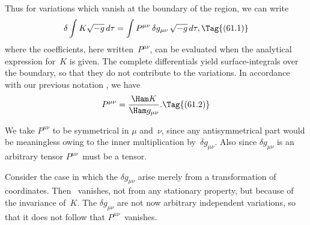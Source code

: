 \documentclass[12pt]{book}
\begin{document}
Thus for variations which vanish at the boundary of the region, we can
write
\[
\delta \int K \sqrt{-g}\, d\tau
= \int P^{\mu\nu}\, \delta g_{\mu\nu}\, \sqrt{-g}\, d\tau,
\Tag{(61.1)}
\]
where the coefficients, here written~$P^{\mu\nu}$, can be evaluated when the analytical
expression for~$K$ is given. The complete differentials yield surface-integrals
over the boundary, so that they do not contribute to the variations. In
accordance with our previous notation , we have
\[
P^{\mu\nu} = \frac{\Ham K}{\Ham g_{\mu\nu}}.
\Tag{(61.2)}
\]

We take $P^{\mu\nu}$ to be symmetrical in $\mu$ and~$\nu$, since any antisymmetrical part
would be meaningless owing to the inner multiplication by~$\delta g_{\mu\nu}$. Also since
$\delta g_{\mu\nu}$ is an arbitrary tensor $P^{\mu\nu}$~must be a tensor.

Consider the case in which the $\delta g_{\mu\nu}$ arise merely from a transformation of
coordinates. Then ~vanishes, not from any stationary property, but
because of the invariance of~$K$. The $\delta g_{\mu\nu}$ are not now arbitrary independent
variations, so that it does not follow that $P^{\mu\nu}$~vanishes.
\end{document}
